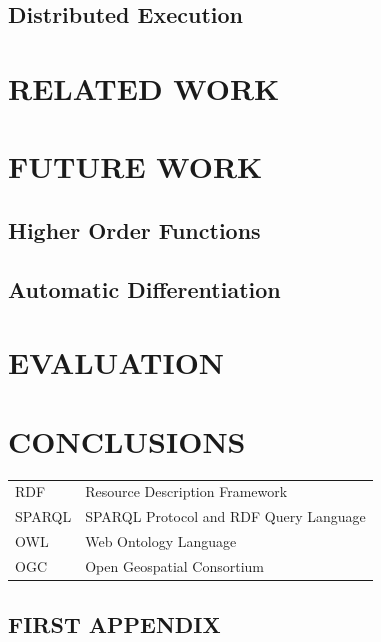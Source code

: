 \documentclass[ack,preface]{dithesis}
\begin{document}
    \section{Distributed Execution}

\chapter{RELATED WORK}

\chapter{FUTURE WORK}
 
   \section{Higher Order Functions}

    \section{Automatic Differentiation}

\chapter{EVALUATION}

\chapter{CONCLUSIONS}

\backmatter

\abbreviations
\begin{center}
	\renewcommand{\arraystretch}{1.5}
	\begin{longtable}{ l @{\qquad} l }
	\toprule
	RDF    & Resource Description Framework \\
	SPARQL & SPARQL Protocol and RDF Query Language \\
	OWL    & Web Ontology Language \\
	OGC    & Open Geospatial Consortium \\
	\bottomrule
	\end{longtable}
\end{center}

\begin{appendix}
\appendixstartedtrue

{}

\chapter{FIRST APPENDIX}

\end{appendix}



\end{document}
